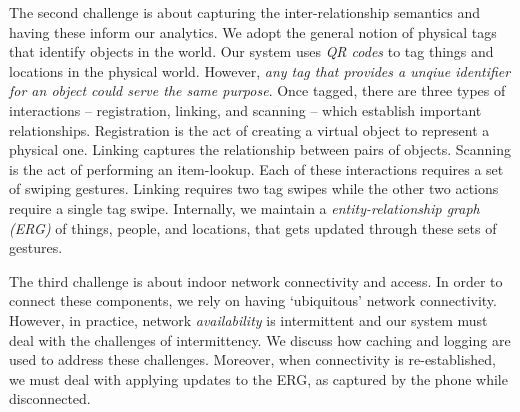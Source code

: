 The second challenge is about capturing the inter-relationship semantics and having these inform our  analytics.
We adopt the general notion of physical tags that identify objects in the world.  Our system uses \emph{QR codes} to tag things and locations 
in the physical world.  However, \emph{any tag that provides a unqiue identifier for an object could serve the same purpose}.
Once tagged, there are three types of interactions -- 
registration, linking, and scanning -- which establish important relationships.  Registration is the act of creating a virtual object 
to represent a physical one.  Linking captures the relationship between pairs of objects.  Scanning is the act of performing an item-lookup.
Each of these interactions requires a set of swiping gestures.  Linking requires two tag swipes while the other two actions
require a single tag swipe.  Internally, we maintain a \emph{entity-relationship graph (ERG)} of things, people, and locations, that gets
updated through these sets of gestures.

The third challenge is about indoor network connectivity and access.
In order to connect these components, we rely on having `ubiquitous' network connectivity.  However, in practice, network
\emph{availability} is intermittent and our system must deal with the challenges of intermittency.  We discuss how caching
and logging are used to address these challenges.  Moreover, when connectivity is re-established, we must deal with
applying updates to the ERG, as captured by the phone while disconnected.  
  

